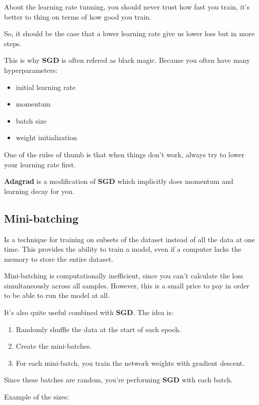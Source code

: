 \documentclass[11pt, a4paper]{article}
\begin{document}
About the learning rate tunning, you should never trust how fast you train, it's better to thing on terms of how good you train. 

So, it should be the case that a lower learning rate give us lower loss but in more steps. 


This is why \textbf{SGD} is often refered as black magic. Because you often have many hyperparameters:

\begin{itemize}
	\item initial learning rate
	\item momentum
	\item batch size
	\item weight initialization
\end{itemize}


One of the rules of thumb is that when things don't work, always try to lower your learning rate first. 

\textbf{Adagrad} is a modification of \textbf{SGD} which implicitly does momentum and learning decay for you. 

\subsection{Mini-batching}%
\label{sub:mini_batching}

Is a technique for training on subsets of the dataset instead of all the data at one time. This provides the ability to train a model, even if a computer lacks the memory to store the entire dataset.


Mini-batching is computationally inefficient, since you can't calculate the loss simultaneously across all samples. However, this is a small price to pay in order to be able to run the model at all.

It's also quite useful combined with \textbf{SGD}. The idea is:

\begin{enumerate}
	\item Randomly shuffle the data at the start of each epoch.
	\item Create the mini-batches.
	\item For each mini-batch, you train the network weights with gradient descent. 
\end{enumerate}

Since these batches are random, you're performing \textbf{SGD} with each batch.

Example of the sizes:
\end{document}

